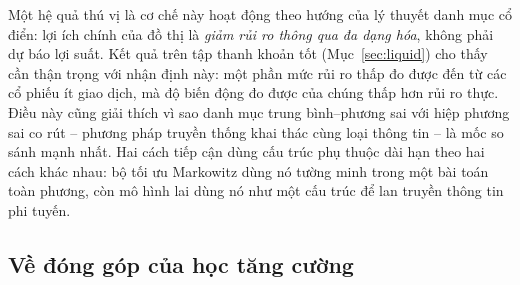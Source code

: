 Một hệ quả thú vị là cơ chế này hoạt động theo hướng của lý thuyết danh mục cổ điển: lợi ích chính của đồ thị là \emph{giảm rủi ro thông qua đa dạng hóa}, không phải dự báo lợi suất. Kết quả trên tập thanh khoản tốt (Mục~\ref{sec:liquid}) cho thấy cần thận trọng với nhận định này: một phần mức rủi ro thấp đo được đến từ các cổ phiếu ít giao dịch, mà độ biến động đo được của chúng thấp hơn rủi ro thực. Điều này cũng giải thích vì sao danh mục trung bình--phương sai với hiệp phương sai co rút -- phương pháp truyền thống khai thác cùng loại thông tin -- là mốc so sánh mạnh nhất. Hai cách tiếp cận dùng cấu trúc phụ thuộc dài hạn theo hai cách khác nhau: bộ tối ưu Markowitz dùng nó tường minh trong một bài toán toàn phương, còn mô hình lai dùng nó như một cấu trúc để lan truyền thông tin phi tuyến.

\subsection{Về đóng góp của học tăng cường}


